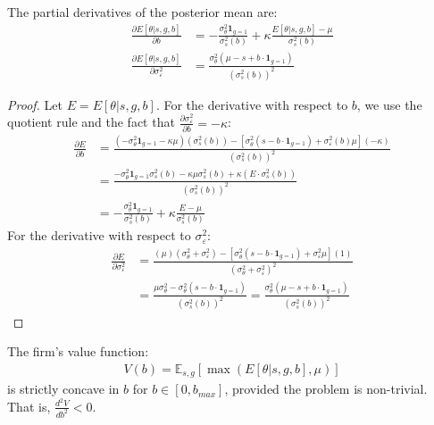 \begin{lemma}\label{lemma:posterior_derivatives}
The partial derivatives of the posterior mean are:
\begin{align}
\frac{\partial E[\theta | s, g, b]}{\partial b} &= -\frac{\sigma_\theta^2 \mathbf{1}_{g=1}}{\sigma_s^2(b)} + \kappa \frac{E[\theta|s,g,b] - \mu}{\sigma_s^2(b)} \\
\frac{\partial E[\theta | s, g, b]}{\partial \sigma_\varepsilon^2} &= \frac{\sigma_\theta^2(\mu - s + b \cdot \mathbf{1}_{g=1})}{(\sigma_s^2(b))^2}
\end{align}
\end{lemma}

\begin{proof}
Let $E = E[\theta | s, g, b]$. For the derivative with respect to $b$, we use the quotient rule and the fact that $\frac{\partial \sigma_\varepsilon^2}{\partial b} = -\kappa$:
\begin{align}
\frac{\partial E}{\partial b} &= \frac{(-\sigma_\theta^2 \mathbf{1}_{g=1} - \kappa \mu)(\sigma_s^2(b)) - [\sigma_\theta^2 (s - b \cdot \mathbf{1}_{g=1}) + \sigma_\varepsilon^2(b) \mu](-\kappa)}{(\sigma_s^2(b))^2} \\
&= \frac{-\sigma_\theta^2 \mathbf{1}_{g=1}\sigma_s^2(b) - \kappa \mu \sigma_s^2(b) + \kappa (E \cdot \sigma_s^2(b))}{(\sigma_s^2(b))^2} \\
&= -\frac{\sigma_\theta^2 \mathbf{1}_{g=1}}{\sigma_s^2(b)} + \kappa \frac{E - \mu}{\sigma_s^2(b)}
\end{align}
For the derivative with respect to $\sigma_\varepsilon^2$:
\begin{align}
\frac{\partial E}{\partial \sigma_\varepsilon^2} &= \frac{(\mu)(\sigma_\theta^2 + \sigma_\varepsilon^2) - [\sigma_\theta^2 (s - b \cdot \mathbf{1}_{g=1}) + \sigma_\varepsilon^2 \mu](1)}{(\sigma_\theta^2 + \sigma_\varepsilon^2)^2} \\
&= \frac{\mu \sigma_\theta^2 - \sigma_\theta^2 (s - b \cdot \mathbf{1}_{g=1})}{(\sigma_s^2(b))^2} = \frac{\sigma_\theta^2(\mu - s + b \cdot \mathbf{1}_{g=1})}{(\sigma_s^2(b))^2}
\end{align}
\end{proof}

\begin{lemma}
    \label{lemma:concavity}
    The firm's value function: 
    \begin{align}
        V(b) = \mathbb{E}_{s,g}[\max(E[\theta | s, g, b], \mu)]
    \end{align} 
    is strictly concave in $b$ for $b \in [0, b_{max}]$, provided the problem is non-trivial. That is, $\frac{d^2V}{db^2} < 0$.
    \end{lemma}
    

